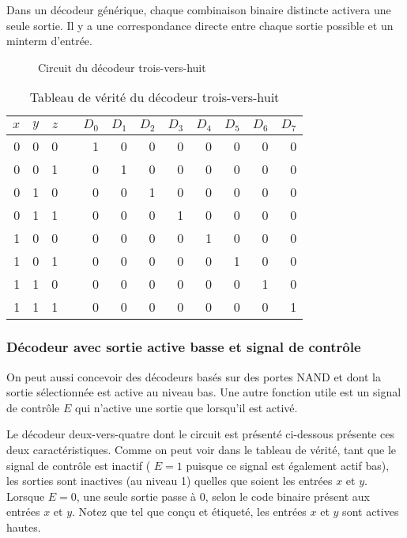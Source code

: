 \documentclass[11pt]{article}
\begin{document}
Dans un décodeur générique, chaque combinaison binaire distincte
activera une seule sortie. Il y a une correspondance directe entre
chaque sortie possible et un minterm d'entrée.

\begin{figure}[htbp]
\centering

\caption{\label{fig:org54eef5b}Circuit du décodeur trois-vers-huit}
\end{figure}


\begin{table}[htbp]
\caption{\label{tab:orgba6ec43}Tableau de vérité du décodeur trois-vers-huit}
\centering
\begin{tabular}{rrrlrrrrrrrr}
\(x\) & \(y\) & \(z\) &  & \(D_0\) & \(D_1\) & \(D_2\) & \(D_3\) & \(D_4\) & \(D_5\) & \(D_6\) & \(D_7\)\\
\hline
0 & 0 & 0 &  & 1 & 0 & 0 & 0 & 0 & 0 & 0 & 0\\
0 & 0 & 1 &  & 0 & 1 & 0 & 0 & 0 & 0 & 0 & 0\\
0 & 1 & 0 &  & 0 & 0 & 1 & 0 & 0 & 0 & 0 & 0\\
0 & 1 & 1 &  & 0 & 0 & 0 & 1 & 0 & 0 & 0 & 0\\
1 & 0 & 0 &  & 0 & 0 & 0 & 0 & 1 & 0 & 0 & 0\\
1 & 0 & 1 &  & 0 & 0 & 0 & 0 & 0 & 1 & 0 & 0\\
1 & 1 & 0 &  & 0 & 0 & 0 & 0 & 0 & 0 & 1 & 0\\
1 & 1 & 1 &  & 0 & 0 & 0 & 0 & 0 & 0 & 0 & 1\\
\end{tabular}
\end{table}

\subsubsection{Décodeur avec sortie active basse et signal de contrôle}
\label{sec:org18635bb}

On peut aussi concevoir des décodeurs basés sur des portes NAND et
dont la sortie sélectionnée est active au niveau bas. Une autre
fonction utile est un signal de contrôle \(E\) qui n'active une sortie
que lorsqu'il est activé.

Le décodeur deux-vers-quatre dont le circuit est présenté ci-dessous
présente ces deux caractéristiques. Comme on peut voir dans le tableau
de vérité, tant que le signal de contrôle est inactif ( \(E = 1\)
puisque ce signal est également actif bas), les sorties sont inactives
(au niveau 1) quelles que soient les entrées \(x\) et \(y\). Lorsque
\(E = 0\), une seule sortie passe à 0, selon le code binaire présent
aux entrées \(x\) et \(y\). Notez que tel que conçu et étiqueté, les
entrées \(x\) et \(y\) sont actives hautes.
\end{document}
